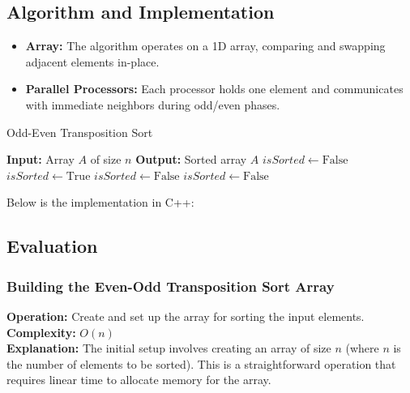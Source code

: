 \subsection{Algorithm and Implementation}
\begin{itemize}
    \item \textbf{Array:} The algorithm operates on a 1D array, comparing and swapping adjacent elements in-place.
    \item \textbf{Parallel Processors:} Each processor holds one element and communicates with immediate neighbors during odd/even phases.
\end{itemize}

\begin{algorithm}
    \caption{Odd-Even Transposition Sort}
    \begin{algorithmic}[1]
        \State \textbf{Input:} Array $A$ of size $n$
        \State \textbf{Output:} Sorted array $A$
            \State $isSorted \gets \text{False}$
                \State $isSorted \gets \text{True}$
                        \State {}
                        \State $isSorted \gets \text{False}$
                    \EndIf
                \EndFor
                        \State {}
                        \State $isSorted \gets \text{False}$
                    \EndIf
                \EndFor
            \EndWhile
        \EndFunction
    \end{algorithmic}
\end{algorithm}

Below is the implementation in C++:

\begin{minipage}{\textwidth}
\centering
    
\end{minipage}

\subsection{Evaluation}
\subsubsection{Building the Even-Odd Transposition Sort Array}
\textbf{Operation:} Create and set up the array for sorting the input elements. \\
\textbf{Complexity:} $O(n)$ \\
\textbf{Explanation:} The initial setup involves creating an array of size $n$ (where $n$ is the number of elements to be sorted). This is a straightforward operation that requires linear time to allocate memory for the array.

